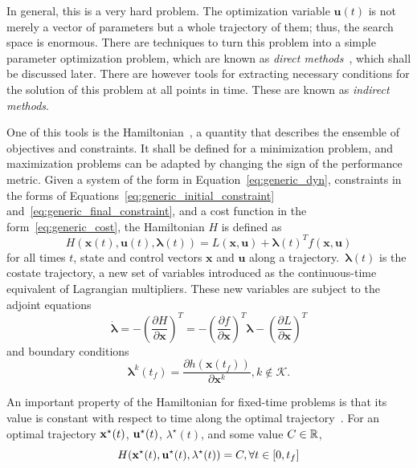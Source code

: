 In general, this is a very hard problem. The optimization variable \(\mathbf{u}(t)\) is not merely a vector of parameters but a whole trajectory of them; thus, the search space is enormous. There are techniques to turn this problem into a simple parameter optimization problem, which are known as \textit{direct methods}~\cite{Conway_2010}, which shall be discussed later. There are however tools for extracting necessary conditions for the solution of this problem at all points in time. These are known as \textit{indirect methods}.

One of this tools is the Hamiltonian~\cite{Conway_2010}, a quantity that describes the ensemble of objectives and constraints. It shall be defined for a minimization problem, and maximization problems can be adapted by changing the sign of the performance metric. Given a system of the form in Equation~\eqref{eq:generic_dyn}, constraints in the forms of Equations~\eqref{eq:generic_initial_constraint} and~\eqref{eq:generic_final_constraint}, and a cost function in the form~\eqref{eq:generic_cost}, the Hamiltonian \(H\) is defined as~\cite{bertsekas}
\begin{equation}
    H(\mathbf{x}(t), \mathbf{u}(t), \mathbf{\lambda}(t)) = L(\mathbf{x}, \mathbf{u}) + \mathbf{\lambda}{(t)}^T f(\mathbf{x}, \mathbf{u})
\end{equation}
for all times \(t\), state and control vectors \(\mathbf{x}  \) and \(\mathbf{u}\) along a trajectory.\ \( \mathbf{\lambda}(t) \) is the costate trajectory, a new set of variables introduced as the continuous-time equivalent of Lagrangian multipliers. These new variables are subject to the adjoint equations
\begin{equation}
    \dot{\mathbf{\lambda}} = - \left( \frac{\partial H}{\partial \mathbf{x}} \right)^T = -\left( \frac{\partial f}{\partial \mathbf{x}} \right)^T \mathbf{\lambda} - \left( \frac{\partial L}{\partial \mathbf{x}} \right)^T
\end{equation}
and boundary conditions~\cite{bryson_applied_optimal_control}
\begin{equation}\label{eq:final_costate}
    \mathbf{\lambda}^k(t_f) = \frac{\partial h(\mathbf{x}(t_f))}{\partial \mathbf{x}^k}, k \notin \mathcal{K}.
\end{equation}

An important property of the Hamiltonian for fixed-time problems is that its value is constant with respect to time along the optimal trajectory~\cite{bertsekas}. For an optimal trajectory \(\mathbf{x}^\star(t)\), \(\mathbf{u}^\star(t)\), \(\lambda^\star(t)\), and some value \(C \in \mathbb{R}\),
\begin{equation}\label{eq:constant_hamilt}
    H(\x^\star(t), \uc^\star(t), \lambda^\star(t)) = C, \forall t \in [0, t_f]
\end{equation}

